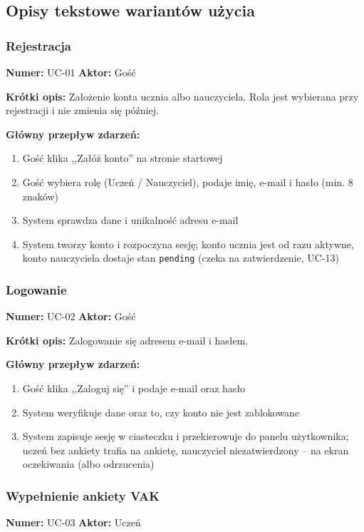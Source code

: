 \subsection{Opisy tekstowe wariantów użycia}

\subsubsection{Rejestracja}
\textbf{Numer:} UC-01 \quad \textbf{Aktor:} Gość

\textbf{Krótki opis:} Założenie konta ucznia albo nauczyciela. Rola jest wybierana przy rejestracji i nie zmienia się później.

\textbf{Główny przepływ zdarzeń:}
\begin{enumerate}[leftmargin=*]
    \item Gość klika ,,Załóż konto'' na stronie startowej
    \item Gość wybiera rolę (Uczeń / Nauczyciel), podaje imię, e-mail i hasło (min. 8 znaków)
    \item System sprawdza dane i unikalność adresu e-mail
    \item System tworzy konto i rozpoczyna sesję; konto ucznia jest od razu aktywne, konto nauczyciela dostaje stan \texttt{pending} (czeka na zatwierdzenie, UC-13)
\end{enumerate}

\subsubsection{Logowanie}
\textbf{Numer:} UC-02 \quad \textbf{Aktor:} Gość

\textbf{Krótki opis:} Zalogowanie się adresem e-mail i hasłem.

\textbf{Główny przepływ zdarzeń:}
\begin{enumerate}[leftmargin=*]
    \item Gość klika ,,Zaloguj się'' i podaje e-mail oraz hasło
    \item System weryfikuje dane oraz to, czy konto nie jest zablokowane
    \item System zapisuje sesję w ciasteczku i przekierowuje do panelu użytkownika; uczeń bez ankiety trafia na ankietę, nauczyciel niezatwierdzony -- na ekran oczekiwania (albo odrzucenia)
\end{enumerate}

\subsubsection{Wypełnienie ankiety VAK}
\textbf{Numer:} UC-03 \quad \textbf{Aktor:} Uczeń

